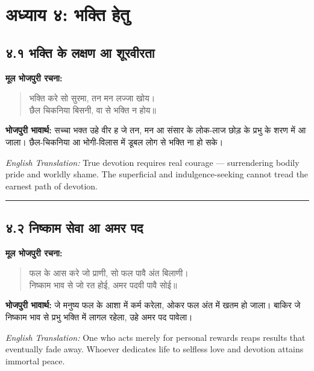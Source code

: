 
\cleardoublepage
\section*{अध्याय ४: भक्ति हेतु}

\subsection*{४.१ भक्ति के लक्षण आ शूरवीरता}

\textbf{मूल भोजपुरी रचना:}

\begin{quote}
भक्ति करे सो सुरमा, तन मन लज्जा खोय।\\
छैल चिकनिया बिसनी, वा से भक्ति न होय॥
\end{quote}

\textbf{भोजपुरी भावार्थ:} सच्चा भक्त उहे वीर ह जे तन, मन आ संसार के लोक-लाज छोड़ के प्रभु के शरण में आ जाला। छैल-चिकनिया आ भोगी-विलास में डूबल लोग से भक्ति ना हो सके।

\begin{sloppypar}
{\engfont \textit{English Translation:} True devotion requires real courage --- surrendering bodily pride and worldly shame.
The superficial and indulgence-seeking cannot tread the earnest path of devotion.}
\end{sloppypar}

\begin{center}
{\color{bordercolor}\rule{0.4\textwidth}{0.4pt}}
\end{center}

\subsection*{४.२ निष्काम सेवा आ अमर पद}

\textbf{मूल भोजपुरी रचना:}

\begin{quote}
फल के आस करे जो प्राणी, सो फल पावै अंत बिलाणी।\\
निष्काम भाव से जो रत होई, अमर पदवी पावै सोई॥
\end{quote}

\textbf{भोजपुरी भावार्थ:} जे मनुष्य फल के आशा में कर्म करेला, ओकर फल अंत में खतम हो जाला। बाकिर जे निष्काम भाव से प्रभु भक्ति में लागल रहेला, उहे अमर पद पावेला।

\begin{sloppypar}
{\engfont \textit{English Translation:} One who acts merely for personal rewards reaps results that eventually fade away.
Whoever dedicates life to selfless love and devotion attains immortal peace.}
\end{sloppypar}
